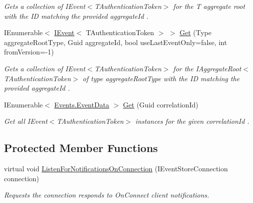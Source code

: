 \begin{DoxyCompactItemize}
\begin{DoxyCompactList}\small\item\em Gets a collection of I\+Event$<$\+T\+Authentication\+Token$>$ for the {\itshape T} aggregate root with the ID matching the provided {\itshape aggregate\+Id} . \end{DoxyCompactList}\item 
I\+Enumerable$<$ \hyperlink{interfaceCqrs_1_1Events_1_1IEvent}{I\+Event}$<$ T\+Authentication\+Token $>$ $>$ \hyperlink{classCqrs_1_1EventStore_1_1EventStore_a60e5974f82d907cad6e74ea29fb13e71_a60e5974f82d907cad6e74ea29fb13e71}{Get} (Type aggregate\+Root\+Type, Guid aggregate\+Id, bool use\+Last\+Event\+Only=false, int from\+Version=-\/1)
\begin{DoxyCompactList}\small\item\em Gets a collection of I\+Event$<$\+T\+Authentication\+Token$>$ for the I\+Aggregate\+Root$<$\+T\+Authentication\+Token$>$ of type {\itshape aggregate\+Root\+Type}  with the ID matching the provided {\itshape aggregate\+Id} . \end{DoxyCompactList}\item 
I\+Enumerable$<$ \hyperlink{classCqrs_1_1Events_1_1EventData}{Events.\+Event\+Data} $>$ \hyperlink{classCqrs_1_1EventStore_1_1EventStore_a898b51899af27db8aa0fb0c0dc75b25d_a898b51899af27db8aa0fb0c0dc75b25d}{Get} (Guid correlation\+Id)
\begin{DoxyCompactList}\small\item\em Get all I\+Event$<$\+T\+Authentication\+Token$>$ instances for the given {\itshape correlation\+Id} . \end{DoxyCompactList}\end{DoxyCompactItemize}
\subsection*{Protected Member Functions}
\begin{DoxyCompactItemize}
\item 
virtual void \hyperlink{classCqrs_1_1EventStore_1_1EventStore_add7396a800fe8f64c61406311e8fee1d_add7396a800fe8f64c61406311e8fee1d}{Listen\+For\+Notifications\+On\+Connection} (I\+Event\+Store\+Connection connection)
\begin{DoxyCompactList}\small\item\em Requests the {\itshape connection}  responds to On\+Connect client notifications. \end{DoxyCompactList}\end{DoxyCompactItemize}
